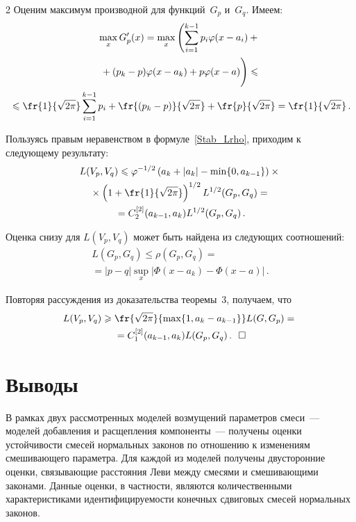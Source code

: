 \begin{multicols}{2}
Оценим максимум производной для функций~$G_p$ и~$G_q$. Имеем:
\begin{multline*}
\max\limits_x G_p'(x)=\max\limits_x\left(\sum\limits_{i=1}^{k-1}
p_i\varphi(x-a_i)+{}\right.\\
\left.{}+(p_k-p)\varphi(x-a_k)+p\varphi(x-a)
\vphantom{\sum\limits_{i=1}^{k-1}}\right)\leqslant{}\\
{}\leqslant \fr{1}{\sqrt{2\pi}}\sum\limits_{i=1}^{k-1}
p_i+\fr{(p_k-p)}{\sqrt{2\pi}}+\fr{p}{\sqrt{2\pi}}
=\fr{1}{\sqrt{2\pi}}\,.
\end{multline*}

Пользуясь правым неравенством в формуле~\eqref{Stab_Lrho},
приходим к следующему результату:
\begin{multline*}
L(V_p,V_q)\leqslant\varphi^{-1/2}\left(a_k+|a_k|-\min\{0,a_{k-1}\}\right)\times{}\\
{}\times
\left(1+\fr{1}{\sqrt{2\pi}}\right)^{1/2}L^{1/2}(G_p,G_q)={}\\
{}=C_2^{[2]}(a_{k-1},a_k)L^{1/2}(G_p,G_q)\,.
\end{multline*}

Оценка снизу для $L(V_p,V_q)$ может быть найдена из следующих
соотношений:
\begin{multline*}
L(G_p,G_q)\leqslant\rho(G_p,G_q)={}\\
{}=|p-q|\sup\limits_x|
\Phi(x-a_k)-\Phi(x-a)|\,.
\end{multline*}

Повторяя рассуждения из доказательства
теоремы~3, получаем, что
\begin{multline*}
L(V_p,V_q)\geqslant\fr{\sqrt{2\pi}}{\max\{1,a_k-a_{k-1}\}}L(G,G_p)
={}\\
{}=C_1^{[2]}(a_{k-1},a_k)L(G_p,G_q)\,.~~\square
\end{multline*}


\section{Выводы}

В рамках двух рассмотренных моделей возмущений параметров смеси~---
моделей добавления и расщепления компоненты~--- получены оценки
устойчивости смесей нормальных законов по отношению к изменениям
смешивающего параметра. Для каждой из моделей получены
двусторонние оценки, связывающие расстояния Леви между смесями и
смешивающими законами. Данные оценки, в частности, являются
количественными характеристиками идентифицируемости конечных
сдвиговых смесей нормальных законов.


\end{multicols}
